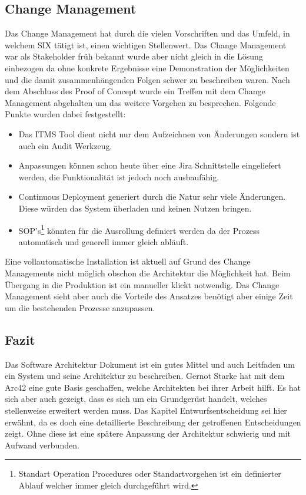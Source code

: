 \subsection{Change Management}

Das Change Management hat durch die vielen Vorschriften und das Umfeld, in welchem SIX tätigt ist, einen wichtigen Stellenwert. Das Change Management war als Stakeholder früh bekannt wurde aber nicht gleich in die Lösung einbezogen da ohne konkrete Ergebnisse eine Demonstration der Möglichkeiten und die damit zusammenhängenden Folgen schwer zu beschreiben waren. Nach dem Abschluss des Proof of Concept wurde ein Treffen mit dem Change Management abgehalten um das weitere Vorgehen zu besprechen. Folgende Punkte wurden dabei festgestellt:
	
\begin{itemize}
	\item Das ITMS Tool dient nicht nur dem Aufzeichnen von Änderungen sondern ist auch ein Audit Werkzeug.
	\item Anpassungen können schon heute über eine Jira Schnittstelle eingeliefert werden, die Funktionalität ist jedoch noch ausbaufähig.
	\item Continuous Deployment generiert durch die Natur sehr viele Änderungen. Diese würden das System überladen und keinen Nutzen bringen.
	\item SOP's\footnote{Standart Operation Procedures oder Standartvorgehen ist ein definierter Ablauf welcher immer gleich durchgeführt wird.} könnten für die Ausrollung definiert werden da der Prozess automatisch und generell immer gleich abläuft. 
\end{itemize}

Eine vollautomatische Installation ist aktuell auf Grund des Change Managements nicht möglich obschon die Architektur die Möglichkeit hat. Beim Übergang in die Produktion ist ein manueller klickt notwendig. Das Change Management sieht aber auch die Vorteile des Ansatzes benötigt aber einige Zeit um die bestehenden Prozesse anzupassen. 

\subsection{Fazit}

Das Software Architektur Dokument ist ein gutes Mittel und auch Leitfaden um ein System und seine Architektur zu beschreiben. Gernot Starke hat mit dem Arc42 eine gute Basis geschaffen, welche Architekten bei ihrer Arbeit hilft. Es hat sich aber auch gezeigt, dass es sich um ein Grundgerüst handelt, welches stellenweise erweitert werden muss. Das Kapitel Entwurfsentscheidung sei hier erwähnt, da es doch eine detaillierte Beschreibung der getroffenen Entscheidungen zeigt. Ohne diese ist eine spätere Anpassung der Architektur schwierig und mit Aufwand verbunden.
\newpage
